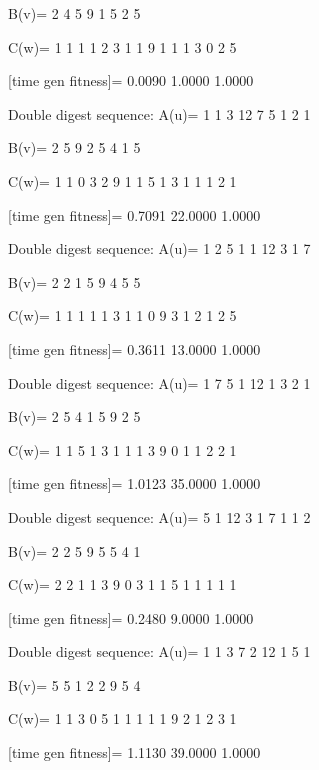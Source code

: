 B(v)=
     2     4     5     9     1     5     2     5

C(w)=
     1     1     1     1     2     3     1     1     9     1     1     1     3     0     2     5

[time gen fitness]=
    0.0090    1.0000    1.0000

Double digest sequence:
A(u)=
     1     1     3    12     7     5     1     2     1

B(v)=
     2     5     9     2     5     4     1     5

C(w)=
     1     1     0     3     2     9     1     1     5     1     3     1     1     1     2     1

[time gen fitness]=
    0.7091   22.0000    1.0000

Double digest sequence:
A(u)=
     1     2     5     1     1    12     3     1     7

B(v)=
     2     2     1     5     9     4     5     5

C(w)=
     1     1     1     1     1     3     1     1     0     9     3     1     2     1     2     5

[time gen fitness]=
    0.3611   13.0000    1.0000

Double digest sequence:
A(u)=
     1     7     5     1    12     1     3     2     1

B(v)=
     2     5     4     1     5     9     2     5

C(w)=
     1     1     5     1     3     1     1     1     3     9     0     1     1     2     2     1

[time gen fitness]=
    1.0123   35.0000    1.0000

Double digest sequence:
A(u)=
     5     1    12     3     1     7     1     1     2

B(v)=
     2     2     5     9     5     5     4     1

C(w)=
     2     2     1     1     3     9     0     3     1     1     5     1     1     1     1     1

[time gen fitness]=
    0.2480    9.0000    1.0000

Double digest sequence:
A(u)=
     1     1     3     7     2    12     1     5     1

B(v)=
     5     5     1     2     2     9     5     4

C(w)=
     1     1     3     0     5     1     1     1     1     1     9     2     1     2     3     1

[time gen fitness]=
    1.1130   39.0000    1.0000

